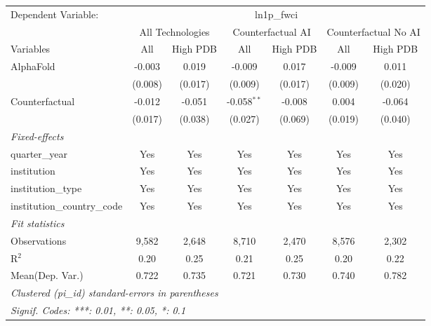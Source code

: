 \begingroup
\centering
\begin{tabular}{lcccccc}
   \tabularnewline \midrule \midrule
   Dependent Variable: & \multicolumn{6}{c}{ln1p\_fwci}\\
 & \multicolumn{2}{c}{All Technologies} & \multicolumn{2}{c}{Counterfactual AI} & \multicolumn{2}{c}{Counterfactual No AI} \\
\cmidrule(lr){1-1}\cmidrule(lr){2-3} \cmidrule(lr){4-5} \cmidrule(lr){6-7}
Variables & \multicolumn{1}{c}{All} & \multicolumn{1}{c}{High PDB} & \multicolumn{1}{c}{All} & \multicolumn{1}{c}{High PDB} & \multicolumn{1}{c}{All} & \multicolumn{1}{c}{High PDB} \\
\cmidrule(lr){1-1}\cmidrule(lr){2-2} \cmidrule(lr){3-3} \cmidrule(lr){4-4} \cmidrule(lr){5-5} \cmidrule(lr){6-6} \cmidrule(lr){7-7}
   AlphaFold                    & -0.003  & 0.019   & -0.009        & 0.017   & -0.009  & 0.011\\   
                                & (0.008) & (0.017) & (0.009)       & (0.017) & (0.009) & (0.020)\\   
   Counterfactual               & -0.012  & -0.051  & -0.058$^{**}$ & -0.008  & 0.004   & -0.064\\   
                                & (0.017) & (0.038) & (0.027)       & (0.069) & (0.019) & (0.040)\\   
   \midrule
   \emph{Fixed-effects}\\
   quarter\_year                & Yes     & Yes     & Yes           & Yes     & Yes     & Yes\\  
   institution                  & Yes     & Yes     & Yes           & Yes     & Yes     & Yes\\  
   institution\_type            & Yes     & Yes     & Yes           & Yes     & Yes     & Yes\\  
   institution\_country\_code   & Yes     & Yes     & Yes           & Yes     & Yes     & Yes\\  
   \midrule
   \emph{Fit statistics}\\
   Observations                 & 9,582   & 2,648   & 8,710         & 2,470   & 8,576   & 2,302\\  
   R$^2$                        & 0.20    & 0.25    & 0.21          & 0.25    & 0.20    & 0.22\\  
Mean(Dep. Var.) & 0.722 & 0.735 & 0.721 & 0.730 & 0.740 & 0.782 \\
   \midrule \midrule
   \multicolumn{7}{l}{\emph{Clustered (pi\_id) standard-errors in parentheses}}\\
   \multicolumn{7}{l}{\emph{Signif. Codes: ***: 0.01, **: 0.05, *: 0.1}}\\
\end{tabular}
\par\endgroup
